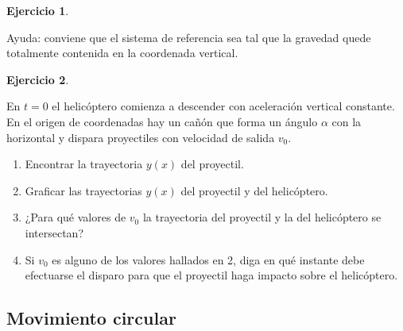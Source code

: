 \documentclass[a4paper,12pt,twoside]{book}
\newtheorem{ejercicio}{{Ejercicio}}[chapter]
\begin{document}
\begin{mdframed}[style=ejercicio-intermedio]
    \begin{ejercicio}
    \end{ejercicio}
    \begin{center}
        \def\svgwidth{0.8\linewidth}
        
    \end{center}
    
    Ayuda: conviene que el sistema de referencia sea tal que la gravedad quede totalmente contenida en la coordenada vertical.
\end{mdframed}

\begin{mdframed}[style=ejercicio-dificil]
    \begin{ejercicio}
    \end{ejercicio}
    En $t=0$ el helicóptero comienza a descender con aceleración vertical constante. En el origen de coordenadas hay un cañón que forma un ángulo $\alpha$ con la horizontal y dispara proyectiles con velocidad de salida $v_0$.
    \begin{enumerate}
        \item Encontrar la trayectoria $y(x)$ del proyectil.
        \item Graficar las trayectorias $y(x)$ del proyectil y del helicóptero.
        \item ¿Para qué valores de $v_0$ la trayectoria del proyectil y la del helicóptero se intersectan?
        \item Si $v_0$ es alguno de los valores hallados en 2, diga en qué instante debe efectuarse el disparo para que el proyectil haga impacto sobre el helicóptero.
    \end{enumerate}
\end{mdframed}


\subsection{Movimiento circular}
\end{document}
